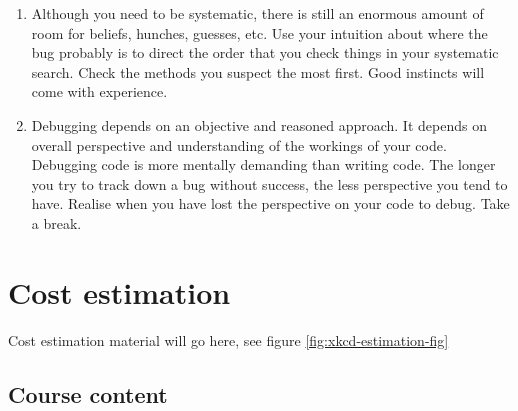 \documentclass[
]{book}
\begin{document}
\begin{enumerate}
\item
  Although you need to be systematic, there is still an enormous amount of room for beliefs, hunches, guesses, etc. Use your intuition about where the bug probably is to direct the order that you check things in your systematic search. Check the methods you suspect the most first. Good instincts will come with experience.
\item
  Debugging depends on an objective and reasoned approach. It depends on overall perspective and understanding of the workings of your code. Debugging code is more mentally demanding than writing code. The longer you try to track down a bug without success, the less perspective you tend to have. Realise when you have lost the perspective on your code to debug. Take a break.
\end{enumerate}

\hypertarget{estimating}{%
\chapter{Cost estimation}\label{estimating}}

Cost estimation material will go here, see figure \ref{fig:xkcd-estimation-fig}

\hypertarget{course-content}{%
\section{Course content}\label{course-content}}
\end{document}
